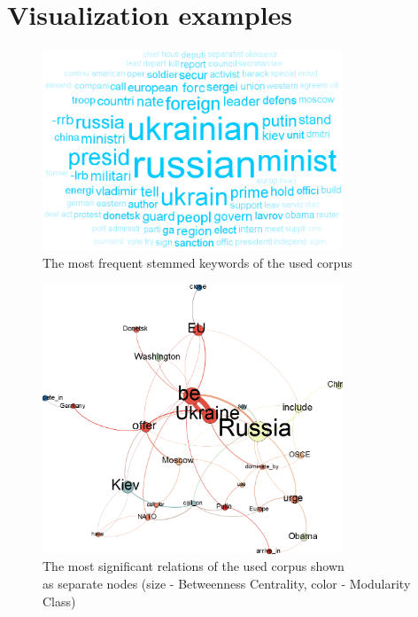 \documentclass[]{article}
\begin{document}
%
\section{Visualization examples}
%
\begin{figure}[htbp]
  \centering
    \includegraphics[width=0.8\textwidth]{images/Cloud}
    \caption{The most frequent stemmed keywords of the used corpus}
  \label{Cloud}
\end{figure}
\begin{figure}[htbp]
  \centering
    \includegraphics[width=0.8\textwidth]{images/AllRelations}
    \captionsetup{justification=centering}
    \caption{The most significant relations of the used corpus shown \\ as separate nodes (size - Betweenness Centrality, color - Modularity Class)}
  \label{AllRelations}
\end{figure}
\end{document}
